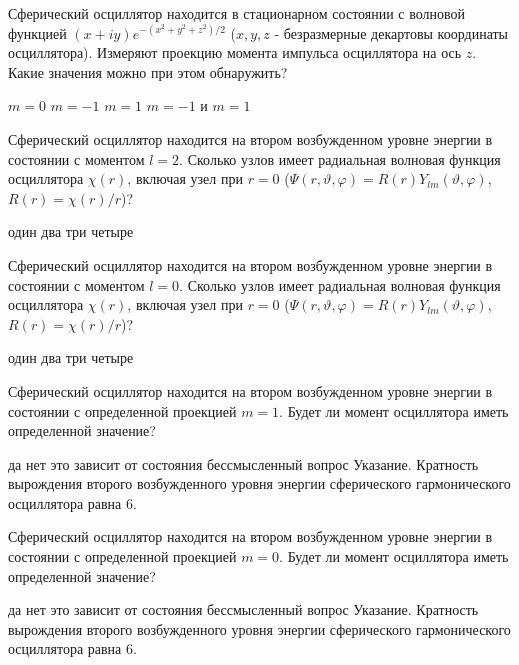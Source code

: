 \documentclass[11pt,a4paper]{exam}
\begin{document}
\begin{questions}
\question Сферический осциллятор находится в стационарном состоянии с волновой функцией $\left( {x + iy} \right){e^{ - ({x^2} + {y^2} + {z^2})/2}}$ ($x,y,z$ - безразмерные декартовы координаты осциллятора). Измеряют проекцию момента импульса осциллятора на ось $z$. Какие значения можно при этом обнаружить? 
\begin{choices}
\choice $m = 0$     
\choice $m =  - 1$
\choice $m = 1$     
\choice $m =  - 1$ и $m = 1$
\end{choices}

\question  Сферический осциллятор находится на втором возбужденном уровне энергии в состоянии с моментом $l = 2$. Сколько узлов имеет радиальная волновая функция осциллятора $\chi (r)$, включая узел при $r = 0$ ($\Psi (r,\vartheta ,\varphi ) = R(r){Y_{lm}}(\vartheta ,\varphi )$, $R(r) = \chi (r)/r$)?
\begin{choices}
\choice один  
\choice два      
\choice три      
\choice четыре
\end{choices}

\question  Сферический осциллятор находится на втором возбужденном уровне энергии в состоянии с моментом $l = 0$. Сколько узлов имеет радиальная волновая функция осциллятора $\chi (r)$, включая узел при $r = 0$ ($\Psi (r,\vartheta ,\varphi ) = R(r){Y_{lm}}(\vartheta ,\varphi )$, $R(r) = \chi (r)/r$)?
\begin{choices}
\choice один  
\choice два      
\choice три      
\choice четыре
\end{choices}

\question Сферический осциллятор находится на втором возбужденном уровне энергии в состоянии с определенной проекцией $m = 1$. Будет ли момент осциллятора иметь определенной значение?
\begin{choices}
\choice да    
\choice нет      
\choice это зависит от состояния      
\choice бессмысленный вопрос
Указание. Кратность вырождения второго возбужденного уровня энергии сферического гармонического осциллятора равна 6. 
\end{choices}

\question Сферический осциллятор находится на втором возбужденном уровне энергии в состоянии с определенной проекцией $m = 0$. Будет ли момент осциллятора иметь определенной значение?
\begin{choices}
\choice да    
\choice нет      
\choice это зависит от состояния      
\choice бессмысленный вопрос
Указание. Кратность вырождения второго возбужденного уровня энергии сферического гармонического осциллятора равна 6. 
\end{choices}


\end{questions}
\end{document}
